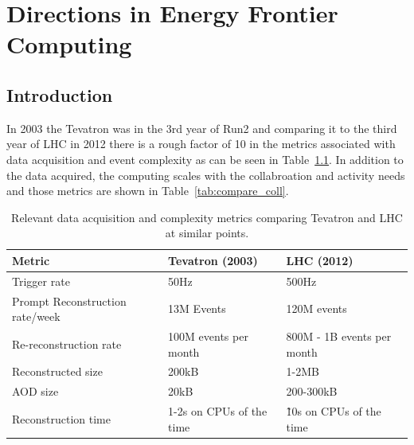  
\chapter{Directions in Energy Frontier Computing}
\label{chap:mag}


\begin{center}\begin{boldmath}



\end{boldmath}\end{center}


\section{Introduction}
\label{sec:comp-intro}

In 2003 the Tevatron was in the 3rd year of Run2 and comparing it to the third 
year of LHC in 2012 there is a rough factor of 10 in the metrics associated with 
data acquisition and event complexity as can be seen in Table~\ref{tab:compare_daq}. In addition to the data acquired, the computing scales with the collabroation and activity needs and those metrics are shown in Table~\ref{tab:compare_coll}.

\begin{table}[t]
\begin{center}
\begin{tabular}{lll}
Metric & Tevatron (2003) & LHC (2012) \\ \hline
Trigger rate & 50Hz & 500Hz \\
Prompt Reconstruction rate/week & 13M Events & 120M events \\
Re-reconstruction rate & 100M events per month & 800M - 1B events per month \\
Reconstructed size & 200kB & 1-2MB \\
AOD size & 20kB & 200-300kB \\
Reconstruction time & 1-2s on CPUs of the time & \~ 10s on CPUs of the time \\ \hline
\end{tabular}
\caption{Relevant data acquisition and complexity metrics comparing Tevatron and LHC at similar points.}
\label{tab:compare_daq}
\end{center}
\end{table}


